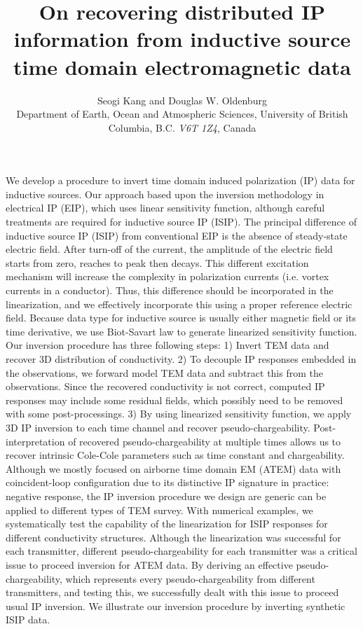 \documentclass[extra,mreferee]{gji}
\author[Seogi Kang and Douglas W. Oldenburg]
   {Seogi Kang and Douglas W. Oldenburg \\
    Department of Earth, Ocean and Atmospheric Sciences,
    University of British Columbia,
    B.C. \emph{V6T 1Z4}, Canada
  }
\title{On recovering distributed IP information from inductive source time domain electromagnetic data}
\begin{document}
\label{firstpage}

\maketitle

\begin{summary}
We develop a procedure to invert time domain induced polarization (IP) data for inductive sources. 
Our approach based upon the inversion methodology in electrical IP (EIP), which uses linear sensitivity function, although careful treatments are required for inductive source IP (ISIP). 
The principal difference of inductive source IP (ISIP) from conventional EIP is the absence of steady-state electric field. 
After turn-off of the current, the amplitude of the electric field starts from zero, reaches to peak then decays. 
This different excitation mechanism will increase the complexity in polarization currents (i.e. vortex currents in a conductor).
Thus, this difference should be incorporated in the linearization, and we effectively incorporate this using a proper reference electric field. 
Because data type for inductive source is usually either magnetic field or its time derivative, we use Biot-Savart law to generate linearized sensitivity function. 
Our inversion procedure has three following steps:
1) Invert TEM data and recover 3D distribution of conductivity.
2) To decouple IP responses embedded in the observations, we forward model TEM data and subtract this from the observations. Since the recovered conductivity is not correct, computed IP responses may include some residual fields, which possibly need to be removed with some post-processings. 
3) By using linearized sensitivity function, we apply 3D IP inversion to each time channel and recover pseudo-chargeability. Post-interpretation of recovered pseudo-chargeability at multiple times allows us to recover intrinsic Cole-Cole parameters such as time constant and chargeability. 
Although we mostly focused on airborne time domain EM (ATEM) data with coincident-loop configuration due to its distinctive IP signature in practice: negative response, the IP inversion procedure we design are generic can be applied to different types of TEM survey. 
With numerical examples, we systematically test the capability of the linearization for ISIP responses for different conductivity structures. 
Although the linearization was successful for each transmitter, different pseudo-chargeability for each transmitter was a critical issue to proceed inversion for ATEM data. 
By deriving an effective pseudo-chargeability, which represents every pseudo-chargeability from different transmitters, and testing this, we successfully dealt with this issue to proceed usual IP inversion. 
We illustrate our inversion procedure by inverting synthetic ISIP data.
\end{summary}
\end{document}
